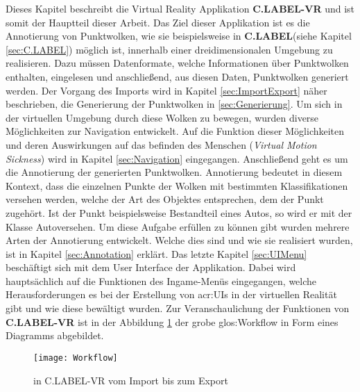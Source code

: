 \graphicspath{{Kapitel/Kapitel4_Hauptteil/Images/}}

Dieses Kapitel beschreibt die Virtual Reality Applikation \textbf{C.LABEL-VR} und ist somit der Hauptteil dieser Arbeit. Das Ziel dieser Applikation ist es die Annotierung von Punktwolken, wie sie beispielsweise in \textbf{C.LABEL}(siehe Kapitel \ref{sec:C.LABEL}) möglich ist, innerhalb einer dreidimensionalen Umgebung zu realisieren. Dazu müssen Datenformate, welche Informationen über Punktwolken enthalten, eingelesen und anschließend, aus diesen Daten, Punktwolken generiert werden. Der Vorgang des Imports wird in Kapitel \ref{sec:ImportExport} näher beschrieben, die Generierung der Punktwolken in \ref{sec:Generierung}. Um sich in der virtuellen Umgebung durch diese Wolken zu bewegen, wurden diverse Möglichkeiten zur Navigation entwickelt. Auf die Funktion dieser Möglichkeiten und deren Auswirkungen auf das befinden des Menschen (\textit{Virtual Motion Sickness}) wird in Kapitel \ref{sec:Navigation} eingegangen. Anschließend geht es um die Annotierung der generierten Punktwolken. Annotierung bedeutet in diesem Kontext, dass die einzelnen Punkte der Wolken mit bestimmten Klassifikationen versehen werden, welche der Art des Objektes entsprechen, dem der Punkt zugehört. Ist der Punkt beispielsweise Bestandteil eines Autos, so wird er mit der Klasse \glqq Auto\grqq versehen. Um diese Aufgabe erfüllen zu können gibt wurden mehrere Arten der Annotierung entwickelt. Welche dies sind und wie sie realisiert wurden, ist in Kapitel \ref{sec:Annotation} erklärt. Das letzte Kapitel \ref{sec:UIMenu} beschäftigt sich mit dem User Interface der Applikation. Dabei wird hauptsächlich auf die Funktionen des Ingame-Menüs eingegangen, welche Herausforderungen es bei der Erstellung von \acrshort{acr:UI}s in der virtuellen Realität gibt und wie diese bewältigt wurden. Zur Veranschaulichung der Funktionen von \textbf{C.LABEL-VR} ist in der Abbildung \ref{fig:Workflow} der grobe \gls{glos:Workflow} in Form eines Diagramms abgebildet.

\begin{figure}%
	\centering
    \texttt{[image: Workflow]}
    \caption{ in C.LABEL-VR vom Import bis zum Export}
    \label{fig:Workflow}
\end{figure}

